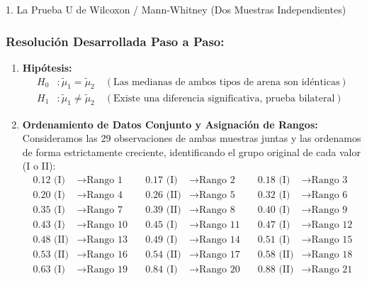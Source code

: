 \documentclass[11pt,a4paper]{article}
\begin{document}
\begin{subsection}{1. La Prueba U de Wilcoxon / Mann-Whitney (Dos Muestras Independientes)}
    \subsubsection*{Resolución Desarrollada Paso a Paso:}
    \begin{enumerate}
        \item \textbf{Hipótesis:}
              \begin{align*}
                  H_0&: \tilde{\mu}_1 = \tilde{\mu}_2 \quad (\text{Las medianas de ambos tipos de arena son idénticas}) \\
                  H_1&: \tilde{\mu}_1 \neq \tilde{\mu}_2 \quad (\text{Existe una diferencia significativa, prueba bilateral})
              \end{align*}
        \item \textbf{Ordenamiento de Datos Conjunto y Asignación de Rangos:}
              Consideramos las 29 observaciones de ambas muestras juntas y las ordenamos de forma estrictamente creciente, identificando el grupo original de cada valor (I o II):
              \begin{align*}
                  0.12 \text{ (I)} &\rightarrow \text{Rango 1} \quad & 0.17 \text{ (I)} &\rightarrow \text{Rango 2} \quad & 0.18 \text{ (I)} &\rightarrow \text{Rango 3} \\
                  0.20 \text{ (I)} &\rightarrow \text{Rango 4} \quad & 0.26 \text{ (II)} &\rightarrow \text{Rango 5} \quad & 0.32 \text{ (I)} &\rightarrow \text{Rango 6} \\
                  0.35 \text{ (I)} &\rightarrow \text{Rango 7} \quad & 0.39 \text{ (II)} &\rightarrow \text{Rango 8} \quad & 0.40 \text{ (I)} &\rightarrow \text{Rango 9} \\
                  0.43 \text{ (I)} &\rightarrow \text{Rango 10} \quad & 0.45 \text{ (I)} &\rightarrow \text{Rango 11} \quad & 0.47 \text{ (I)} &\rightarrow \text{Rango 12} \\
                  0.48 \text{ (II)} &\rightarrow \text{Rango 13} \quad & 0.49 \text{ (I)} &\rightarrow \text{Rango 14} \quad & 0.51 \text{ (I)} &\rightarrow \text{Rango 15} \\
                  0.53 \text{ (II)} &\rightarrow \text{Rango 16} \quad & 0.54 \text{ (II)} &\rightarrow \text{Rango 17} \quad & 0.58 \text{ (II)} &\rightarrow \text{Rango 18} \\
                  0.63 \text{ (I)} &\rightarrow \text{Rango 19} \quad & 0.84 \text{ (I)} &\rightarrow \text{Rango 20} \quad & 0.88 \text{ (II)} &\rightarrow \text{Rango 21} \\

\end{align*}
\end{enumerate}
\end{subsection}
\end{document}
